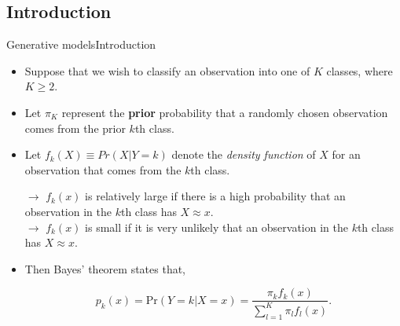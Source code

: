 \subsection{Introduction}
\begin{frame}{Generative models}{Introduction}

\begin{itemize}
    \item Suppose that we wish to classify an observation into one of $K$ classes, where $K \geq 2$. \pause 
    
    \item Let $\pi_K$ represent the \textbf{prior} probability that a randomly chosen observation comes from the prior $k$th class. \pause
    
    \item Let $f_k(X) \equiv  Pr(X|Y = k)$ denote the \textit{density function} of $X$ for an observation that comes from the $k$th class. \\ \pause
    
    $\rightarrow$ $f_k(x)$ is relatively large if there is a high probability that an observation in the $k$th class has $X \approx x$. \\ \pause
    $\rightarrow$ $f_k (x)$ is small if it is very unlikely that an observation in the $k$th class has $X \approx x$. \pause 

    \item Then Bayes’ theorem states that, \pause 


    $$ p_k(x) =  \text{Pr}(Y=k|X=x) = \frac{\pi_k f_k (x)}{  \sum_{l=1}^K \pi_l f_l(x)  }.$$
 
    
\end{itemize}

\end{frame}

